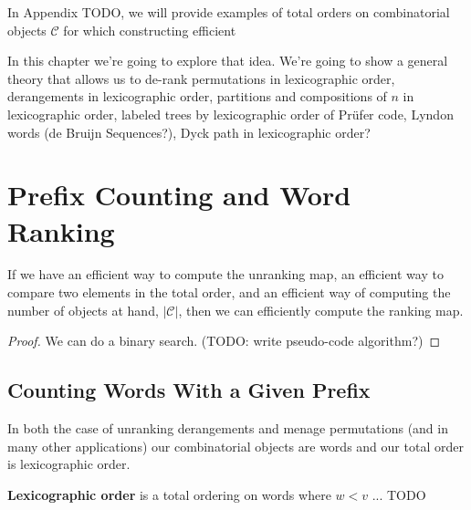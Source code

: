 In Appendix TODO, we will provide examples of total orders on combinatorial
objects $\mathcal{C}$ for which constructing efficient


In this chapter we're going to explore that idea. We're going to show a general
theory that allows us to de-rank
permutations in lexicographic order,
derangements in lexicographic order,
partitions and compositions of $n$ in lexicographic order,
labeled trees by lexicographic order of Pr\"ufer code,
Lyndon words \cite{Kociumaka2014} (de Bruijn Sequences?),
Dyck path in lexicographic order?
\section{Prefix Counting and Word Ranking}


\begin{lemma}
  If we have
  an efficient way to compute the unranking map,
  an efficient way to compare two elements in the total order,
  and an efficient way of computing the number of objects at hand, $|\mathcal C|$,
  then we can efficiently compute the ranking map.
  \label{lemma:unrankToRank}
\end{lemma}
\begin{proof}
  We can do a binary search. (TODO: write pseudo-code algorithm?)
\end{proof}

\subsection{Counting Words With a Given Prefix}
In both the case of unranking derangements and menage permutations
(and in many other applications) our combinatorial objects are
words and our total order is lexicographic order.

\begin{definition}
  \textbf{Lexicographic order} is a total ordering on words where $w < v$ ... TODO
\end{definition}

